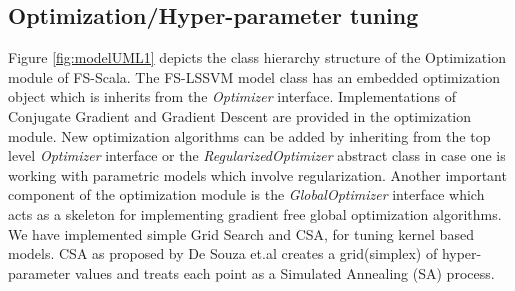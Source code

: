 \documentclass[conference, cmex10]{IEEEtran}
\begin{document}
\subsection*{Optimization/Hyper-parameter tuning}
Figure \ref{fig:modelUML1} depicts the class hierarchy structure of the Optimization module of FS-Scala. The FS-LSSVM model class has an embedded optimization object which is inherits from the \textit{Optimizer} interface. Implementations of Conjugate Gradient and Gradient Descent are provided in the optimization module. New optimization algorithms can be added by inheriting from the top level \textit{Optimizer} interface or the \textit{RegularizedOptimizer} abstract class in case one is working with parametric models which involve regularization. Another important component of the optimization module is the \textit{GlobalOptimizer} interface which acts as a skeleton for implementing gradient free global optimization algorithms. We have implemented simple Grid Search and CSA, for tuning kernel based models. CSA as proposed by De Souza et.al \cite{Xavier-De-Souza2010} creates a grid(simplex) of hyper-parameter values and treats each point as a Simulated Annealing (SA) process.
\end{document}

